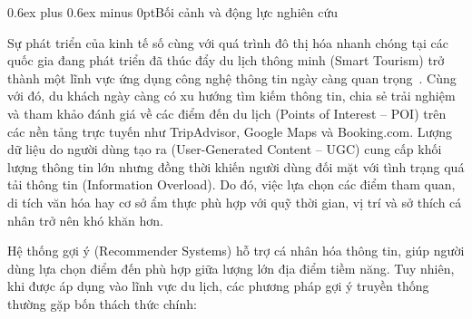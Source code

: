 \documentclass[journal,onecolumn,10pt]{IEEEtran}
\makeatletter
\def\subsection{\@startsection{subsection}{2}{\z@}{1.8ex plus 1.0ex minus 0.3ex}%
{0.6ex plus 0.6ex minus 0pt}{\normalfont\normalsize\bfseries}}
\makeatother
\begin{document}
\subsection{Bối cảnh và động lực nghiên cứu}

Sự phát triển của kinh tế số cùng với quá trình đô thị hóa nhanh chóng tại các quốc gia đang phát triển đã thúc đẩy du lịch thông minh (Smart Tourism) trở thành một lĩnh vực ứng dụng công nghệ thông tin ngày càng quan trọng~\cite{r1, r2, r3, r4}. Cùng với đó, du khách ngày càng có xu hướng tìm kiếm thông tin, chia sẻ trải nghiệm và tham khảo đánh giá về các điểm đến du lịch (Points of Interest -- POI) trên các nền tảng trực tuyến như TripAdvisor, Google Maps và Booking.com. Lượng dữ liệu do người dùng tạo ra (User-Generated Content -- UGC) cung cấp khối lượng thông tin lớn nhưng đồng thời khiến người dùng đối mặt với tình trạng quá tải thông tin (Information Overload). Do đó, việc lựa chọn các điểm tham quan, di tích văn hóa hay cơ sở ẩm thực phù hợp với quỹ thời gian, vị trí và sở thích cá nhân trở nên khó khăn hơn.

Hệ thống gợi ý (Recommender Systems) hỗ trợ cá nhân hóa thông tin, giúp người dùng lựa chọn điểm đến phù hợp giữa lượng lớn địa điểm tiềm năng. Tuy nhiên, khi được áp dụng vào lĩnh vực du lịch, các phương pháp gợi ý truyền thống thường gặp bốn thách thức chính:
\end{document}
